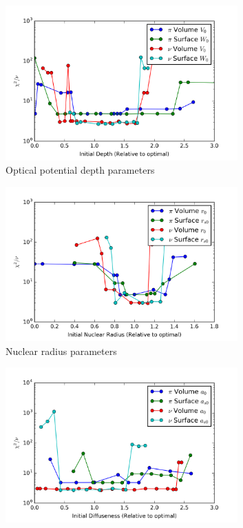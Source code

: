 \begin{figure}[h]
	\begin{subfigure}{0.5\textwidth}
		
		\centering
		\includegraphics[width=0.98\textwidth]{pnV.png}
		\caption{Optical potential depth parameters }
		\label{fig:pnV}
	\end{subfigure}
	\begin{subfigure}{0.5\textwidth}
		\centering
		\includegraphics[width=0.98\textwidth]{pnr.png}
		\caption{Nuclear radius parameters }
		\label{fig:pnr}
	\end{subfigure}
	\begin{subfigure}{0.5\textwidth}
		\centering
		\includegraphics[width=0.98\textwidth]{pna.png}

\end{subfigure}
\end{figure}
